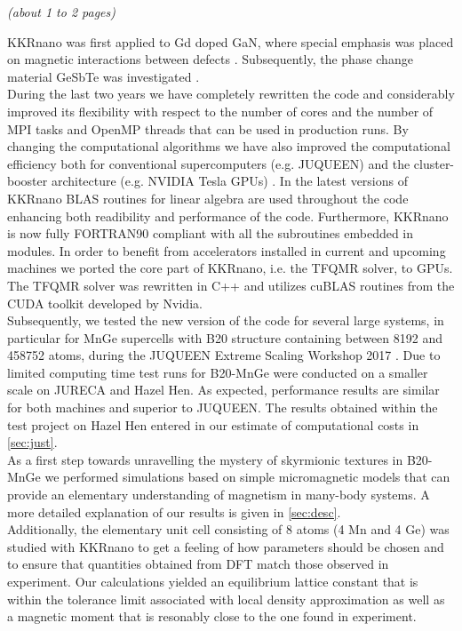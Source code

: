\documentclass [a4paper, 12pt]{article}
\begin{document}
\textit{(about 1 to 2 pages)}

KKRnano was first applied to Gd doped GaN, where special emphasis was placed on
magnetic interactions between defects \cite{thiess_superparamagnetism_2012}. Subsequently,
the phase change material GeSbTe was investigated \cite{zhang_role_2012}.
\\
During the last two years we have completely rewritten the code and considerably improved 
its flexibility with respect to the number of cores and the number of MPI tasks and
OpenMP threads that can be used in production runs. By changing the computational algorithms
we have also improved the computational efficiency both for conventional
supercomputers (e.g. JUQUEEN) and the cluster-booster architecture
(e.g. NVIDIA Tesla GPUs) \cite{dutot_addressing_2016}.
In the latest versions of KKRnano BLAS routines for linear algebra are used throughout the code
enhancing both readibility and performance of the code. Furthermore, KKRnano is now
fully FORTRAN90 compliant with all the subroutines embedded in modules.
In order to benefit from accelerators installed in current and upcoming machines we
ported the core part of KKRnano, i.e. the TFQMR solver, to GPUs. The TFQMR solver was rewritten
in C++ and utilizes cuBLAS routines from the CUDA toolkit developed by Nvidia.
\\
Subsequently, we tested the new version of the code for several large systems, 
in particular for MnGe supercells with B20 structure containing between 8192 and 458752 atoms,
during the JUQUEEN Extreme Scaling Workshop 2017 \cite{brommel_juqueen_2017}.
Due to limited computing time test runs for B20-MnGe were conducted on a smaller scale on JURECA and Hazel Hen.
As expected, performance results are similar for both machines and superior to JUQUEEN.
The results obtained within the test project on Hazel Hen entered
in our estimate of computational costs in \cref{sec:just}.
\\
As a first step towards unravelling the mystery of skyrmionic textures in B20-MnGe we
performed simulations based on simple micromagnetic models that can provide an elementary understanding
of magnetism in many-body systems. A more detailed explanation of our results is given in \cref{sec:desc}.
\\
Additionally, the elementary unit cell consisting of 8 atoms (4 Mn and 4 Ge) was
studied with KKRnano to get a feeling of how parameters should be chosen and
to ensure that quantities obtained from DFT
match those observed in experiment.
Our calculations yielded an equilibrium lattice constant that is within the tolerance limit
associated with local density approximation as well as a magnetic moment that is resonably close to
the one
found in experiment.
\end{document}
